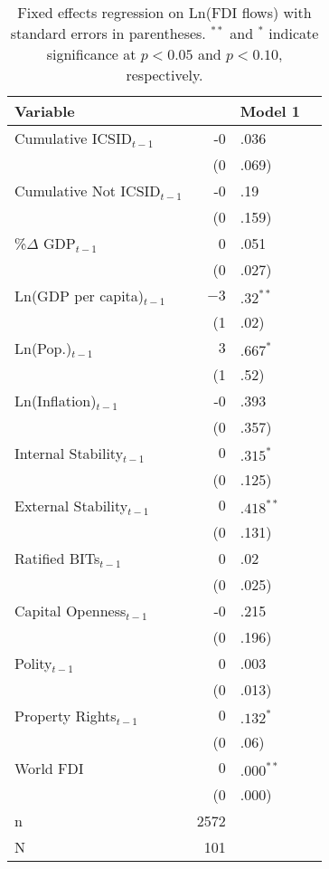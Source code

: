 \begin{enumerate}
\begin{itemize}
			\begin{table}[ht]
			\centering
			\begingroup\footnotesize
			\begin{tabular}{lr@{}lr@{}}
			 Variable && Model 1 \\ 
			  \hline
			\hline
			Cumulative ICSID$_{t-1}$ & -0&.036 \\ 
			   & (0&.069) \\ 
			  Cumulative Not ICSID$_{t-1}$ & -0&.19 \\ 
			   & (0&.159) \\ 
			  \%$\Delta$ GDP$_{t-1}$ & 0&.051 \\ 
			   & (0&.027) \\ 
			  Ln(GDP per capita)$_{t-1}$ & $-3$&$.32^{\ast\ast}$ \\ 
			   & (1&.02) \\ 
			  Ln(Pop.)$_{t-1}$ & $3$&$.667^{\ast}$ \\ 
			   & (1&.52) \\ 
			  Ln(Inflation)$_{t-1}$ & -0&.393 \\ 
			   & (0&.357) \\ 
			  Internal Stability$_{t-1}$ & $0$&$.315^{\ast}$ \\ 
			   & (0&.125) \\ 
			  External Stability$_{t-1}$ & $0$&$.418^{\ast\ast}$ \\ 
			   & (0&.131) \\ 
			  Ratified BITs$_{t-1}$ & 0&.02 \\ 
			   & (0&.025) \\ 
			  Capital Openness$_{t-1}$ & -0&.215 \\ 
			   & (0&.196) \\ 
			  Polity$_{t-1}$ & 0&.003 \\ 
			   & (0&.013) \\ 
			  Property Rights$_{t-1}$ & $0$&$.132^{\ast}$ \\ 
			   & (0&.06) \\ 
			  World FDI & $0$&$.000^{\ast\ast}$ \\ 
			   & (0&.000) \\ 
			   \hline
			n & 2572 \\ 
			  N & 101 \\ 
			   \hline
			\hline
			\end{tabular}
			\endgroup
			\caption{Fixed effects regression on Ln(FDI flows) with standard errors in parentheses. $^{**}$ and $^{*}$ indicate significance at $p< 0.05 $ and $p< 0.10 $, respectively.} 
			\end{table}
			\FloatBarrier
			\clearpage


\end{itemize}
\end{enumerate}
